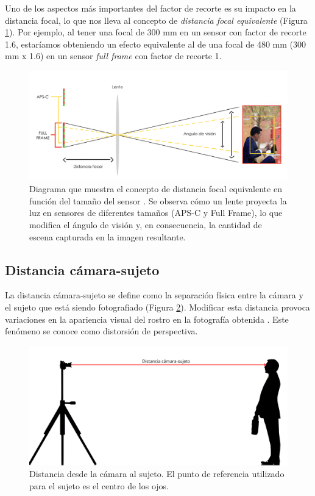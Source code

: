 Uno de los aspectos más importantes del factor de recorte es su impacto en la distancia focal, lo que nos lleva al concepto de \textit{distancia focal equivalente} (Figura \ref{fig13}). Por ejemplo, al tener una focal de 300 mm en un sensor con factor de recorte 1.6, estaríamos obteniendo un efecto equivalente al de una focal de 480 mm (300 mm x 1.6) en un sensor \textit{full frame} con factor de recorte 1.

\begin{figure}[h]
	\centering
	\includegraphics[scale=0.13]{imagenes/cap2/focal-equivalente.png}
	\caption[Ejemplo de distancia focal equivalente.]{Diagrama que muestra el concepto de distancia focal equivalente en función del tamaño del sensor \cite{46}. Se observa cómo un lente proyecta la luz en sensores de diferentes tamaños (APS-C y Full Frame), lo que modifica el ángulo de visión y, en consecuencia, la cantidad de escena capturada en la imagen resultante.}
	\label{fig13}
\end{figure}

\subsection*{Distancia cámara-sujeto}

La distancia cámara-sujeto se define como la separación física entre la cámara y el sujeto que está siendo fotografiado (Figura \ref{fig14}). Modificar esta distancia provoca variaciones en la apariencia visual del rostro en la fotografía obtenida \cite{43}. Este fenómeno se conoce como distorsión de perspectiva.

\begin{figure}[h]
	\centering
	\includegraphics[scale=0.1]{imagenes/cap2/SCD_final.png}
	\caption[Distancia desde la cámara al sujeto.]{Distancia desde la cámara al sujeto. El punto de referencia utilizado para el sujeto es el centro de los ojos.}
	\label{fig14}
\end{figure}

